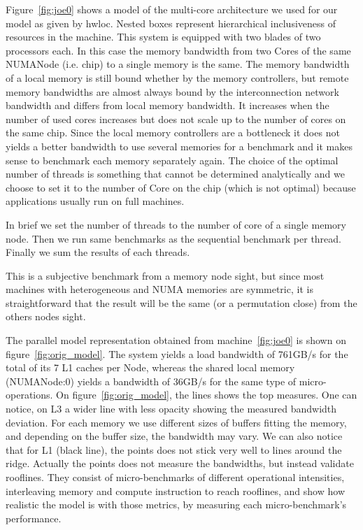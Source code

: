 \documentclass[twoside,twocolumn,8pt]{extarticle}
\begin{document}
Figure~\ref{fig:joe0} shows a model of the multi-core architecture we used for our model as given by hwloc.
Nested boxes represent hierarchical inclusiveness of resources in the machine.
This system is equipped with two blades of two processors each.
In this case the memory bandwidth from two Cores of the same NUMANode (i.e. chip) to a single memory is the same.
The memory bandwidth of a local memory is still bound whether by the memory controllers, but remote memory bandwidths are almost
always bound by the interconnection network bandwidth and differs from local memory bandwidth.
It increases when the number of used cores increases but does not scale up to the number of cores on the same chip.
Since the local memory controllers are a bottleneck it does not yields a better bandwidth to use several memories for a
benchmark and it makes sense to benchmark each memory separately again.
The choice of the optimal number of threads is something that cannot be determined analytically and we choose to
set it to the number of Core on the chip (which is not optimal) because applications usually run on full machines.

In brief we set the number of threads to the number of core of a single memory node. Then we run same benchmarks as the sequential
benchmark per thread. Finally we sum the results of each threads.

This is a subjective benchmark from a memory node sight, but since most machines with heterogeneous and NUMA memories are
symmetric, it is straightforward that the result will be the same (or a permutation close) from the others nodes sight.

The parallel model representation obtained from machine~\ref{fig:joe0} is shown on figure~\ref{fig:orig_model}.
The system yields a load bandwidth of 761GB/s for the total of its 7 L1 caches per Node, whereas the shared local memory
(NUMANode:0) yields a bandwidth of 36GB/s for the same type of micro-operations.
On figure~\ref{fig:orig_model}, the lines shows the top measures.
One can notice, on L3 a wider line with less opacity showing the measured bandwidth deviation.
For each memory we use different sizes of buffers fitting the memory, and depending on the buffer size, the bandwidth may vary.
We can also notice that for L1 (black line), the points does not stick very well to lines around the ridge. Actually the points
does not measure the bandwidths, but instead validate rooflines. They consist of micro-benchmarks of different operational
intensities, interleaving memory and compute instruction to reach rooflines, and show how realistic the model is with those
metrics, by measuring each micro-benchmark's performance.
\end{document}
